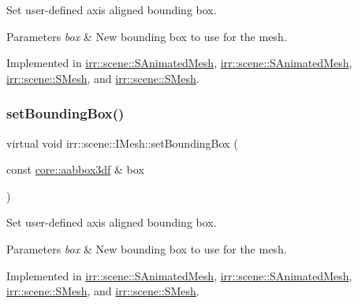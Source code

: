Set user-\/defined axis aligned bounding box. 


\begin{DoxyParams}{Parameters}
{\em box} & New bounding box to use for the mesh. \\
\hline
\end{DoxyParams}


Implemented in \hyperlink{structirr_1_1scene_1_1SAnimatedMesh_ab33614f8ef158c79260d555f69055bf5}{irr\+::scene\+::\+S\+Animated\+Mesh}, \hyperlink{structirr_1_1scene_1_1SAnimatedMesh_ab33614f8ef158c79260d555f69055bf5}{irr\+::scene\+::\+S\+Animated\+Mesh}, \hyperlink{structirr_1_1scene_1_1SMesh_a636e4df4054b2ed2911808cfb6df5cb3}{irr\+::scene\+::\+S\+Mesh}, and \hyperlink{structirr_1_1scene_1_1SMesh_a636e4df4054b2ed2911808cfb6df5cb3}{irr\+::scene\+::\+S\+Mesh}.

\mbox{\label{classirr_1_1scene_1_1IMesh_a0aee3b5bc5d31ce996becc069f65e642}} 
\subsubsection{\texorpdfstring{set\+Bounding\+Box()}{setBoundingBox()}\hspace{0.1cm}{\footnotesize\ttfamily [2/2]}}
{\footnotesize\ttfamily virtual void irr\+::scene\+::\+I\+Mesh\+::set\+Bounding\+Box (\begin{DoxyParamCaption}\item[{const \hyperlink{namespaceirr_1_1core_a60f4b4c744aba55f10530d503c6ecb04}{core\+::aabbox3df} \&}]{box }\end{DoxyParamCaption})\hspace{0.3cm}{\ttfamily [pure virtual]}}



Set user-\/defined axis aligned bounding box. 


\begin{DoxyParams}{Parameters}
{\em box} & New bounding box to use for the mesh. \\
\hline
\end{DoxyParams}


Implemented in \hyperlink{structirr_1_1scene_1_1SAnimatedMesh_ab33614f8ef158c79260d555f69055bf5}{irr\+::scene\+::\+S\+Animated\+Mesh}, \hyperlink{structirr_1_1scene_1_1SAnimatedMesh_ab33614f8ef158c79260d555f69055bf5}{irr\+::scene\+::\+S\+Animated\+Mesh}, \hyperlink{structirr_1_1scene_1_1SMesh_a636e4df4054b2ed2911808cfb6df5cb3}{irr\+::scene\+::\+S\+Mesh}, and \hyperlink{structirr_1_1scene_1_1SMesh_a636e4df4054b2ed2911808cfb6df5cb3}{irr\+::scene\+::\+S\+Mesh}.

